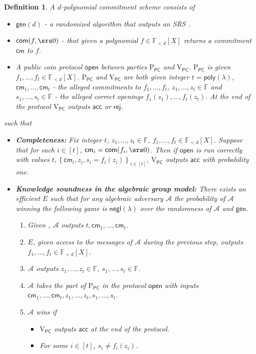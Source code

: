 \documentclass[11pt]{article} %
\newcommand{\F}{\ensuremath{\mathbb F}\xspace}
\newcommand{\adv}{\ensuremath{\mathcal A}\xspace}
\newcommand{\com}{\ensuremath{\mathsf{com}}\xspace}
\newcommand{\cm}{\ensuremath{\mathsf{cm}}\xspace}
\newcommand{\open}{\ensuremath{\mathsf{open}}\xspace}
\newcommand{\negl}{\ensuremath{\mathsf{negl}(\lambda)}\xspace}
\newcommand{\rej}{\ensuremath{\mathsf{rej}}\xspace}
\newcommand{\acc}{\ensuremath{\mathsf{acc}}\xspace}
\newcommand{\sett}[2]{\ensuremath{\set{#1}_{#2}}\xspace}
\newcommand{\gen}{\ensuremath{\mathsf{gen}}\xspace}
\newcommand{\prvpc}{\ensuremath{\mathrm{P_{\mathsf{PC}}}}\xspace}
\newcommand{\verpc}{\ensuremath{\mathrm{V_{\mathsf{PC}}}}\xspace}
\newcommand{\ext}{\ensuremath{E}\xspace}
\newcommand{\set}[1]{\ensuremath{\left\{#1\right\}}\xspace}
\newcommand{\polysofdeg}[1]{\ensuremath{\F_{< #1}[X]}\xspace}
\newtheorem{dfn}[lemma]{Definition}
\newcommand{\poly}{\ensuremath{\mathsf{poly(\lambda)}}\xspace}
\begin{document}
\begin{dfn}\label{dfn:PCscheme}
A $d$-polynomial commitment scheme consists of 
\begin{itemize}
 \item $\gen(d)$ -  a randomized algorithm that outputs an SRS .
 \item $\com(f,\srs0)$ - that given a polynomial $f\in \polysofdeg{d}$ returns a commitment \cm to $f$.
 \item A public coin protocol  \open between parties \prvpc and \verpc. \prvpc is given $ f_1,\ldots,f_t \in \polysofdeg{d}$. \prvpc and \verpc are both given integer $t=\poly$, $\cm_1,\ldots,\cm_t$ - the alleged commitments to $f_1,\ldots,f_t$, $z_1,\ldots,z_t\in\F$ and $s_1,\ldots,s_t\in \F$ - the alleged correct openings $f_1(z_1),\ldots,f_t(z_t)$. At the end of the protocol \verpc outputs \acc or \rej. 
\end{itemize}
such that
\begin{itemize}
 \item \textbf{Completeness:} Fix integer $t$, $z_1,\ldots,z_t\in \F$, $f_1,\ldots,f_t \in \polysofdeg{d}$.
 Suppose that for each $i\in [t]$, $\cm_i = \com(f_i,\srs0)$.  Then if \open is run correctly with values
 $t, \sett{\cm_i,z_i,s_i=f_i(z_i)}{i\in [t]}$, \verpc outputs \acc with probability one.
 \item \textbf{Knowledge soundness in the algebraic group model:} There exists an efficient \ext such that for any algebraic adversary \adv the probability of \adv winning the following game is \negl over the randomness of \adv and \gen.
 \begin{enumerate}
  \item Given , \adv outputs $t,\cm_1,\ldots,\cm_t$.
  \item \ext, given access to the messages of \adv during the previous step, outputs $f_1,\ldots,f_t \in \polysofdeg{d}$.
  \item \adv outputs $ z_1,\ldots,z_t \in \F$, $s_1,\ldots,s_t \in \F$.
  \item \adv takes the part of \prvpc in the protocol \open with inputs
  $\cm_1,\ldots,\cm_t,z_1,\ldots,z_t,s_1,\ldots,s_t$.
  \item $\adv$ wins if 
  \begin{itemize} 
   \item \verpc outputs \acc at the end of the protocol.
   \item For some $i\in [t]$, $s_i\neq f_i(z_i)$.
  \end{itemize}

 \end{enumerate}

\end{itemize}
\end{dfn}
\end{document}
